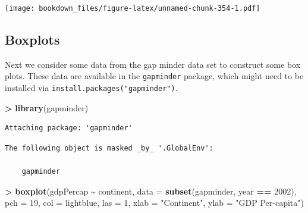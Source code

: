 \documentclass[
]{krantz}
\makeatletter
\newenvironment{Shaded}{\begin{snugshade}}{\end{snugshade}}
\newcommand{\DataTypeTok}[1]{\textcolor[rgb]{0.27,0.27,0.27}{#1}}
\newcommand{\DecValTok}[1]{\textcolor[rgb]{0.06,0.06,0.06}{#1}}
\newcommand{\KeywordTok}[1]{\textcolor[rgb]{0.27,0.27,0.27}{\textbf{#1}}}
\newcommand{\NormalTok}[1]{#1}
\newcommand{\OperatorTok}[1]{\textcolor[rgb]{0.43,0.43,0.43}{\textbf{#1}}}
\newcommand{\StringTok}[1]{\textcolor[rgb]{0.5,0.5,0.5}{#1}}
\newenvironment{kframe}{%
\medskip{}
\setlength{\fboxsep}{.8em}
 \def\at@end@of@kframe{}%
 \ifinner\ifhmode%
  \def\at@end@of@kframe{\end{minipage}}%
  \begin{minipage}{\columnwidth}%
 \fi\fi%
 \def\FrameCommand##1{\hskip\@totalleftmargin \hskip-\fboxsep
 \colorbox{shadecolor}{##1}\hskip-\fboxsep
     \hskip-\linewidth \hskip-\@totalleftmargin \hskip\columnwidth}%
 \MakeFramed {\advance\hsize-\width
   \@totalleftmargin\z@ \linewidth\hsize
   \@setminipage}}%
 {\par\unskip\endMakeFramed%
 \at@end@of@kframe}
\renewenvironment{Shaded}{\begin{kframe}}{\end{kframe}}
\makeatother
\begin{document}
\begin{Shaded}
\end{Shaded}

\texttt{[image: bookdown\_files/figure-latex/unnamed-chunk-354-1.pdf]}

\hypertarget{boxplots-1}{%
\subsection{Boxplots}\label{boxplots-1}}

Next we consider some data from the gap minder data set to construct some box plots. These data are available in the \texttt{gapminder} package, which might need to be installed via \texttt{install.packages("gapminder")}.

\begin{Shaded}
\begin{Highlighting}[]
\OperatorTok{\textgreater{}}\StringTok{ }\KeywordTok{library}\NormalTok{(gapminder)}
\end{Highlighting}
\end{Shaded}

\begin{verbatim}
Attaching package: 'gapminder'
\end{verbatim}

\begin{verbatim}
The following object is masked _by_ '.GlobalEnv':

    gapminder
\end{verbatim}

\begin{Shaded}
\begin{Highlighting}[]
\OperatorTok{\textgreater{}}\StringTok{ }\KeywordTok{boxplot}\NormalTok{(gdpPercap }\OperatorTok{\textasciitilde{}}\StringTok{ }\NormalTok{continent, }\DataTypeTok{data =} \KeywordTok{subset}\NormalTok{(gapminder, year }\OperatorTok{==}\StringTok{ }\DecValTok{2002}\NormalTok{), }\DataTypeTok{pch =} \DecValTok{19}\NormalTok{, }\DataTypeTok{col =} \StringTok{\textquotesingle{}lightblue\textquotesingle{}}\NormalTok{, }\DataTypeTok{las =} \DecValTok{1}\NormalTok{, }\DataTypeTok{xlab =} \StringTok{"Continent"}\NormalTok{, }\DataTypeTok{ylab =} \StringTok{"GDP Per{-}capita"}\NormalTok{)}
\end{Highlighting}
\end{Shaded}
\end{document}
